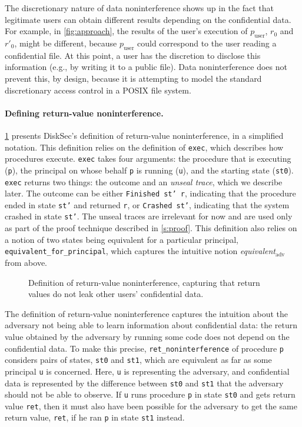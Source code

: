 The discretionary nature of data noninterference shows up in the fact
that legitimate users can obtain different results depending on the
confidential data.  For example, in \ref{fig:approach}, the results
of the user's execution of $p_\mathrm{user}$, $r_0$ and $r'_0$, might be
different, because $p_\mathrm{user}$ could correspond to the user reading
a confidential file.  At this point, a user has the discretion to disclose this information
(e.g., by writing it to a public file).  Data noninterference does not
prevent this, by design, because it is attempting to model the standard
discretionary access control in a POSIX file system.


\paragraph{Defining return-value noninterference.}

\ref{fig:two-safety-ret} presents DiskSec's definition of return-value
noninterference, in a simplified notation.  This definition relies on
the definition of \texttt{exec}, which describes how procedures execute.
\texttt{exec} takes four arguments: the procedure that is executing (\texttt{p}),
the principal on whose behalf \texttt{p} is running (\texttt{u}), and the starting
state (\texttt{st0}).
\texttt{exec} returns two things: the outcome and an \emph{unseal trace},
which we describe later.
The outcome can be either \texttt{Finished st' r}, indicating that the
procedure ended in state \texttt{st'} and returned \texttt{r}, or
\texttt{Crashed st'}, indicating that the system crashed in state \texttt{st'}.
The unseal traces are irrelevant for now and are used only as part of the
proof technique described in \ref{s:proof}.
This definition also relies on a notion of two states being equivalent for
a particular principal, \texttt{equivalent\_for\_principal}, which captures
the intuitive notion \emph{equivalent}$_\mathrm{adv}$ from above.

\begin{figure}[ht]
  
  \caption{Definition of return-value noninterference, capturing that
    return values do not leak other users' confidential data.}
  \label{fig:two-safety-ret}
\end{figure}

The definition of return-value noninterference captures the intuition
about the adversary not being able to learn information about confidential
data: the return value obtained by the adversary by running some
code does not depend on the confidential data.  To make this precise,
\texttt{ret\_noninterference} of procedure \texttt{p} considers pairs of states,
\texttt{st0} and \texttt{st1}, which are equivalent as far as some principal
\texttt{u} is concerned.  Here, \texttt{u} is representing the adversary, and
confidential data is represented by the difference between \texttt{st0} and
\texttt{st1} that the adversary should not be able to observe.  If \texttt{u}
runs procedure \texttt{p} in state \texttt{st0} and gets return value \texttt{ret},
then it must also have been possible for the adversary to get the same
return value, \texttt{ret}, if he ran \texttt{p} in state \texttt{st1} instead.


